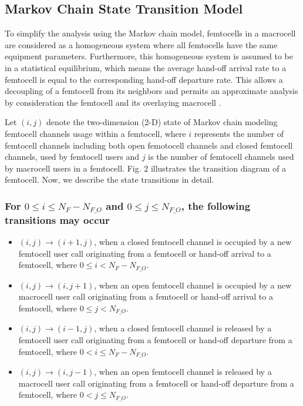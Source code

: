 \documentclass[10pt,final,journal,letterpaper,twoside,twocolumn]{IEEEtran}
\begin{document}
\subsection{Markov Chain State Transition Model}

To simplify the analysis using the Markov chain model, femtocells in a macrocell are considered as a homogeneous system where all femtocells have the same equipment parameters. Furthermore, this homogeneous system is assumed to be in a statistical equilibrium, which means the average hand-off arrival rate to a femtocell is equal to the corresponding hand-off departure rate. This allows a decoupling of a femtocell from its neighbors and permits an approximate analysis by consideration the femtocell and its overlaying macrocell \cite{Hu95}.

Let $\left( {i,j} \right)$
denote the two-dimension (2-D) state of Markov chain modeling femtocell channels usage within a femtocell, where $i$ represents
the number of femtocell channels including both open femotocell channels and closed femtocell channels, used by femtocell users and $j$ is the number of femtocell channels used by macrocell users in a femtocell. Fig. 2 illustrates the transition diagram
of a femtocell. Now, we describe the state transitions in detail.

\subsubsection{For $0 \le i \le {N_F} - {N_{F\_O}}$ and $0 \le j \le
{N_{F\_O}}$, the following transitions may occur}

\begin{itemize}
    \item $\left( {i,j} \right) \to \left( {i + 1,j} \right)$, when a closed
femtocell channel is occupied by a new femtocell user call originating from a femtocell or hand-off arrival to a femtocell, where $0 \le i < {N_F} - {N_{F\_O}}$.
    \item $\left( {i,j} \right) \to \left( {i,j + 1} \right)$, when an open
femtocell channel is occupied by a new macrocell user call originating from a femtocell or hand-off arrival to a femtocell, where $0 \le j <
{N_{F\_O}}$.
    \item $\left( {i,j} \right) \to \left( {i - 1,j} \right)$, when a closed
femtocell channel is released by a femtocell user call originating from a femtocell or hand-off departure from a femtocell, where $0 < i \le {N_F} - {N_{F\_O}}$.
    \item $\left( {i,j} \right) \to \left( {i,j - 1} \right)$, when an
open femtocell channel is released by a macrocell user call originating from a femtocell or hand-off departure from a femtocell, where $0 < j \le
{N_{F\_O}}$.
\end{itemize}
\end{document}

